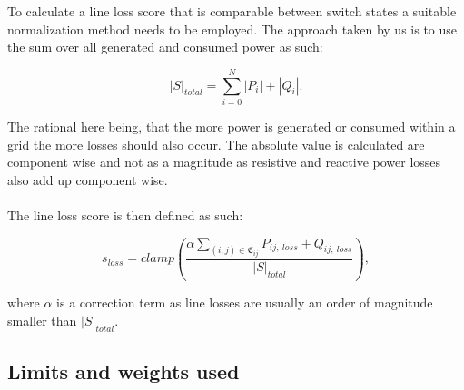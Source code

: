 To calculate a line loss score that is comparable between switch states a suitable
normalization method needs to be employed. The approach taken by us is to use the 
sum over all generated and consumed power as such:

\begin{equation}
    |S|_{total} = \sum_{i=0}^N |P_i| + |Q_i|.
\end{equation}

The rational here being, that the more power is generated or consumed within a grid
the more losses should also occur. The absolute value is calculated are component wise
and not as a magnitude as resistive and reactive power losses also add up component wise.\\
\\
The line loss score is then defined as such:

\begin{equation}
    s_{loss} = clamp(\frac{\alpha \sum_{(i, j) \in \mathfrak{E}_{ij}} P_{ij, \ loss} + Q_{ij, \ loss}}{|S|_{total}}),
\end{equation}

where $\alpha$ is a correction term as line losses are usually an order of magnitude
smaller than $|S|_{total}$.

\subsection{Limits and weights used}


